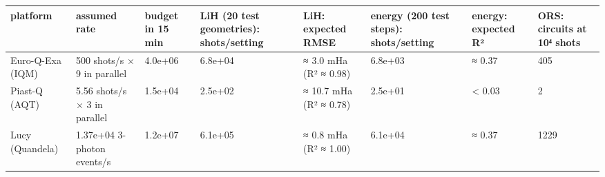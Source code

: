 \begin{tabular}{llllllll}
\toprule
platform & assumed rate & budget in 15 min & LiH (20 test geometries): shots/setting & LiH: expected RMSE & energy (200 test steps): shots/setting & energy: expected R² & ORS: circuits at 10⁴ shots \\
\midrule
Euro-Q-Exa (IQM) & 500 shots/s × 9 in parallel & 4.0e+06 & 6.8e+04 & ≈ 3.0 mHa (R² ≈ 0.98) & 6.8e+03 & ≈ 0.37 & 405 \\
Piast-Q (AQT) & 5.56 shots/s × 3 in parallel & 1.5e+04 & 2.5e+02 & ≈ 10.7 mHa (R² ≈ 0.78) & 2.5e+01 & < 0.03 & 2 \\
Lucy (Quandela) & 1.37e+04 3-photon events/s & 1.2e+07 & 6.1e+05 & ≈ 0.8 mHa (R² ≈ 1.00) & 6.1e+04 & ≈ 0.37 & 1229 \\
\bottomrule
\end{tabular}

